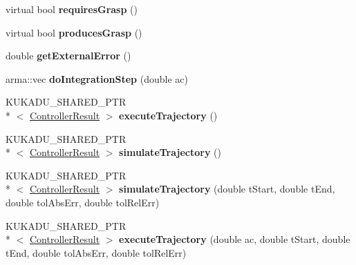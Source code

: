 \begin{DoxyCompactItemize}
\item 
\hypertarget{classkukadu_1_1DMPExecutor_aa346971808b1383e7b0e65f1e611e1ed}{virtual bool {\bfseries requires\-Grasp} ()}\label{classkukadu_1_1DMPExecutor_aa346971808b1383e7b0e65f1e611e1ed}

\item 
\hypertarget{classkukadu_1_1DMPExecutor_ad8949f9211cc71dfc85a49baddc22724}{virtual bool {\bfseries produces\-Grasp} ()}\label{classkukadu_1_1DMPExecutor_ad8949f9211cc71dfc85a49baddc22724}

\item 
\hypertarget{classkukadu_1_1DMPExecutor_af3ea91620f3c2a7686fd56a2df6c9dd1}{double {\bfseries get\-External\-Error} ()}\label{classkukadu_1_1DMPExecutor_af3ea91620f3c2a7686fd56a2df6c9dd1}

\item 
\hypertarget{classkukadu_1_1DMPExecutor_adb5e00c9c60ffddee9e1b0e019a4ee12}{arma\-::vec {\bfseries do\-Integration\-Step} (double ac)}\label{classkukadu_1_1DMPExecutor_adb5e00c9c60ffddee9e1b0e019a4ee12}

\item 
\hypertarget{classkukadu_1_1DMPExecutor_a6f33217d4d3af41fbb58c2d2a394d397}{K\-U\-K\-A\-D\-U\-\_\-\-S\-H\-A\-R\-E\-D\-\_\-\-P\-T\-R\\*
$<$ \hyperlink{classkukadu_1_1ControllerResult}{Controller\-Result} $>$ {\bfseries execute\-Trajectory} ()}\label{classkukadu_1_1DMPExecutor_a6f33217d4d3af41fbb58c2d2a394d397}

\item 
\hypertarget{classkukadu_1_1DMPExecutor_a7e0a8b15b047b3781e3185ceb9922e0e}{K\-U\-K\-A\-D\-U\-\_\-\-S\-H\-A\-R\-E\-D\-\_\-\-P\-T\-R\\*
$<$ \hyperlink{classkukadu_1_1ControllerResult}{Controller\-Result} $>$ {\bfseries simulate\-Trajectory} ()}\label{classkukadu_1_1DMPExecutor_a7e0a8b15b047b3781e3185ceb9922e0e}

\item 
\hypertarget{classkukadu_1_1DMPExecutor_a7c49950c3d809601a115bab006e8436f}{K\-U\-K\-A\-D\-U\-\_\-\-S\-H\-A\-R\-E\-D\-\_\-\-P\-T\-R\\*
$<$ \hyperlink{classkukadu_1_1ControllerResult}{Controller\-Result} $>$ {\bfseries simulate\-Trajectory} (double t\-Start, double t\-End, double tol\-Abs\-Err, double tol\-Rel\-Err)}\label{classkukadu_1_1DMPExecutor_a7c49950c3d809601a115bab006e8436f}

\item 
\hypertarget{classkukadu_1_1DMPExecutor_a4fe15de30bd8ffac30494b5135afe453}{K\-U\-K\-A\-D\-U\-\_\-\-S\-H\-A\-R\-E\-D\-\_\-\-P\-T\-R\\*
$<$ \hyperlink{classkukadu_1_1ControllerResult}{Controller\-Result} $>$ {\bfseries execute\-Trajectory} (double ac, double t\-Start, double t\-End, double tol\-Abs\-Err, double tol\-Rel\-Err)}\label{classkukadu_1_1DMPExecutor_a4fe15de30bd8ffac30494b5135afe453}

\end{DoxyCompactItemize}
